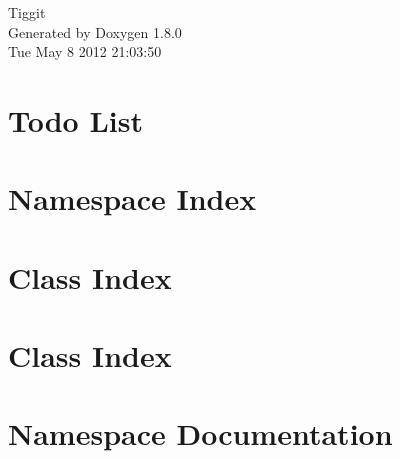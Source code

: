 \documentclass{book}
\begin{document}
\hypersetup{pageanchor=false,citecolor=blue}
\begin{titlepage}
\vspace*{7cm}
\begin{center}
{\Large Tiggit }\\
\vspace*{1cm}
{\large Generated by Doxygen 1.8.0}\\
\vspace*{0.5cm}
{\small Tue May 8 2012 21:03:50}\\
\end{center}
\end{titlepage}
\clearemptydoublepage
{}
\tableofcontents
\clearemptydoublepage
{}
\hypersetup{pageanchor=true,citecolor=blue}
\chapter{Todo List}
\label{todo}
\hypertarget{todo}{}

\chapter{Namespace Index}

\chapter{Class Index}

\chapter{Class Index}

\chapter{Namespace Documentation}

\end{document}
